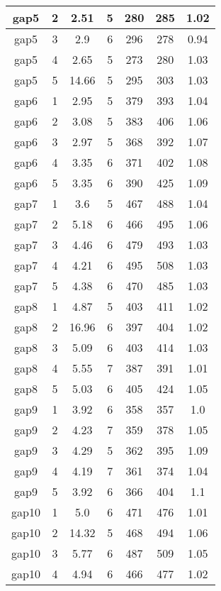 \documentclass[12pt, a4paper]{article}
\begin{document}
\begin{longtable}{|c|c|c|c|c|c|c|}
  \hline
  gap5 & 2 & 2.51 & 5 & 280 & 285 & 1.02 \\
  \hline
  gap5 & 3 & 2.9 & 6 & 296 & 278 & 0.94 \\
  \hline
  gap5 & 4 & 2.65 & 5 & 273 & 280 & 1.03 \\
  \hline
  gap5 & 5 & 14.66 & 5 & 295 & 303 & 1.03 \\
  \hline
  gap6 & 1 & 2.95 & 5 & 379 & 393 & 1.04 \\
  \hline
  gap6 & 2 & 3.08 & 5 & 383 & 406 & 1.06 \\
  \hline
  gap6 & 3 & 2.97 & 5 & 368 & 392 & 1.07 \\
  \hline
  gap6 & 4 & 3.35 & 6 & 371 & 402 & 1.08 \\
  \hline
  gap6 & 5 & 3.35 & 6 & 390 & 425 & 1.09 \\
  \hline
  gap7 & 1 & 3.6 & 5 & 467 & 488 & 1.04 \\
  \hline
  gap7 & 2 & 5.18 & 6 & 466 & 495 & 1.06 \\
  \hline
  gap7 & 3 & 4.46 & 6 & 479 & 493 & 1.03 \\
  \hline
  gap7 & 4 & 4.21 & 6 & 495 & 508 & 1.03 \\
  \hline
  gap7 & 5 & 4.38 & 6 & 470 & 485 & 1.03 \\
  \hline
  gap8 & 1 & 4.87 & 5 & 403 & 411 & 1.02 \\
  \hline
  gap8 & 2 & 16.96 & 6 & 397 & 404 & 1.02 \\
  \hline
  gap8 & 3 & 5.09 & 6 & 403 & 414 & 1.03 \\
  \hline
  gap8 & 4 & 5.55 & 7 & 387 & 391 & 1.01 \\
  \hline
  gap8 & 5 & 5.03 & 6 & 405 & 424 & 1.05 \\
  \hline
  gap9 & 1 & 3.92 & 6 & 358 & 357 & 1.0 \\
  \hline
  gap9 & 2 & 4.23 & 7 & 359 & 378 & 1.05 \\
  \hline
  gap9 & 3 & 4.29 & 5 & 362 & 395 & 1.09 \\
  \hline
  gap9 & 4 & 4.19 & 7 & 361 & 374 & 1.04 \\
  \hline
  gap9 & 5 & 3.92 & 6 & 366 & 404 & 1.1 \\
  \hline
  gap10 & 1 & 5.0 & 6 & 471 & 476 & 1.01 \\
  \hline
  gap10 & 2 & 14.32 & 5 & 468 & 494 & 1.06 \\
  \hline
  gap10 & 3 & 5.77 & 6 & 487 & 509 & 1.05 \\
  \hline
  gap10 & 4 & 4.94 & 6 & 466 & 477 & 1.02 \\

\end{longtable}
\end{document}
